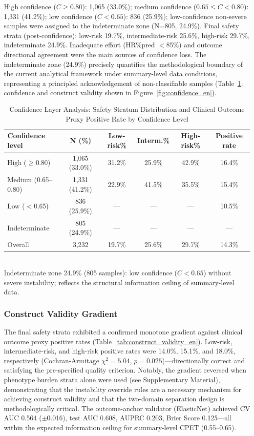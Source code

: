 \documentclass[12pt, a4paper]{article}
\begin{document}
High confidence ($C \geq 0.80$): 1,065 (33.0\%); medium confidence
($0.65 \leq C < 0.80$): 1,331 (41.2\%); low confidence ($C < 0.65$):
836 (25.9\%); low-confidence non-severe samples were assigned to the
indeterminate zone (N=805, 24.9\%).
Final safety strata (post-confidence): low-risk 19.7\%, intermediate-risk 25.6\%,
high-risk 29.7\%, indeterminate 24.9\%. Inadequate effort (HR\%pred $<$85\%)
and outcome directional agreement were the main sources of confidence loss.
The indeterminate zone (24.9\%) precisely quantifies the methodological boundary
of the current analytical framework under summary-level data conditions,
representing a principled acknowledgement of non-classifiable samples
(Table~\ref{tab:confidence_layers_en}; confidence and construct validity shown
in Figure~\ref{fig:confidence_en}).

\begin{table}[htbp]
\centering
\small
\caption{Confidence Layer Analysis: Safety Stratum Distribution and Clinical Outcome Proxy Positive Rate by Confidence Level}
\label{tab:confidence_layers_en}
\begin{tabular}{lccccc}
\toprule
Confidence level & N (\%) & Low-risk\% & Interm.\% & High-risk\% & Positive rate \\
\midrule
High ($\geq$0.80) & 1,065 (33.0\%) & 31.2\% & 25.9\% & 42.9\% & 16.4\% \\
Medium (0.65--0.80) & 1,331 (41.2\%) & 22.9\% & 41.5\% & 35.5\% & 15.4\% \\
Low ($<$0.65) & 836 (25.9\%) & — & — & — & 10.5\% \\
Indeterminate & 805 (24.9\%) & — & — & — & — \\
\midrule
Overall & 3,232 & 19.7\% & 25.6\% & 29.7\% & 14.3\% \\
\bottomrule
\end{tabular}
\\[1ex]
{\footnotesize Indeterminate zone 24.9\% (805 samples): low confidence ($C<0.65$) without severe instability;
reflects the structural information ceiling of summary-level data.}
\end{table}

\subsubsection{Construct Validity Gradient}

The final safety strata exhibited a confirmed monotone gradient against
clinical outcome proxy positive rates (Table~\ref{tab:construct_validity_en}).
Low-risk, intermediate-risk, and high-risk positive rates were 14.0\%, 15.1\%,
and 18.0\%, respectively (Cochran-Armitage $\chi^2 = 5.04$, $p = 0.025$)---directionally
correct and satisfying the pre-specified quality criterion. Notably, the gradient reversed when phenotype burden strata
alone were used (see Supplementary Material), demonstrating that the instability
override rules are a necessary mechanism for achieving construct validity and
that the two-domain separation design is methodologically critical.
The outcome-anchor validator (ElasticNet) achieved CV AUC 0.564 ($\pm$0.016),
test AUC 0.608, AUPRC 0.203, Brier Score 0.125---all within the expected
information ceiling for summary-level CPET (0.55--0.65).
\end{document}
